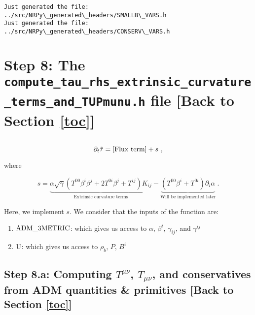 \documentclass[landscape,letterpaper,10pt,english]{article}
\providecommand{\tightlist}{%
      \setlength{\itemsep}{0pt}\setlength{\parskip}{0pt}}
\begin{document}
    \begin{Verbatim}[commandchars=\\\{\}]
Just generated the file: ../src/NRPy\_generated\_headers/SMALLB\_VARS.h
Just generated the file: ../src/NRPy\_generated\_headers/CONSERV\_VARS.h
    \end{Verbatim}

    \section{\texorpdfstring{Step 8: The
\texttt{compute\_tau\_rhs\_extrinsic\_curvature\_terms\_and\_TUPmunu.h}
file {[}Back to
Section \ref{toc}{]}}{Step 8: The compute\_tau\_rhs\_extrinsic\_curvature\_terms\_and\_TUPmunu.h file {[}Back to {]}}}\label{step-8-the-compute_tau_rhs_extrinsic_curvature_terms_and_tupmunu.h-file-back-to-top}

\[\label{compute_tau_rhs_extrinsic_curvature_terms_and_tupmunu}\]

\[
\partial_{t}\tilde\tau = \left[\rm Flux\ term\right] + s\ ,
\]

where

\[
s = \underbrace{\alpha\sqrt{\gamma}\left(T^{00}\beta^{i}\beta^{j} + 2T^{0i}\beta^{j} + T^{ij}\right)K_{ij}}_{\text{Extrinsic curvature terms}} - \underbrace{\left(T^{00}\beta^{i} + T^{0i}\right)\partial_{i}\alpha}_{\text{Will be implemented later}}\ .
\]

Here, we implement \(s\). We consider that the inputs of the function
are:

\begin{enumerate}
\def\labelenumi{\arabic{enumi}.}
\tightlist
\item
  \(\rm ADM\_3METRIC\): which gives us access to \(\alpha\),
  \(\beta^{i}\), \(\gamma_{ij}\), and \(\gamma^{ij}\)
\item
  \(\rm U\): which gives us access to \(\rho_{b}\), \(P\), \(B^{i}\)
\end{enumerate}

    \subsection{\texorpdfstring{Step 8.a: Computing \(T^{\mu\nu}\),
\(T_{\mu\nu}\), and conservatives from ADM quantities \& primitives
{[}Back to
Section \ref{toc}{]}}{Step 8.a: Computing T\^{}\{\textbackslash{}mu\textbackslash{}nu\}, T\_\{\textbackslash{}mu\textbackslash{}nu\}, and conservatives from ADM quantities \& primitives {[}Back to {]}}}\label{step-8.a-computing-tmunu-t_munu-and-conservatives-from-adm-quantities-primitives-back-to-top}
\end{document}
